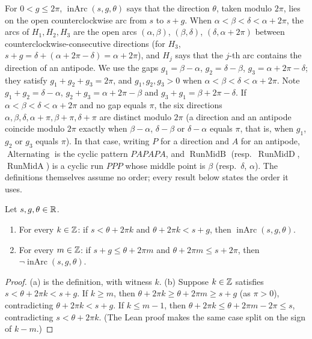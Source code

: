 \begin{remark}\label{pc:rem:reading}
For $0<g\le2\pi$, $\operatorname{inArc}(s,g,\theta)$ says that the direction $\theta$, taken modulo $2\pi$, lies
on the open counterclockwise arc from $s$ to $s+g$. When $\alpha<\beta<\delta<\alpha+2\pi$, the arcs of
$H_1,H_2,H_3$ are the open arcs $(\alpha,\beta)$, $(\beta,\delta)$, $(\delta,\alpha+2\pi)$ between
counterclockwise-consecutive directions (for $H_3$, $s+g=\delta+(\alpha+2\pi-\delta)=\alpha+2\pi$), and $H_j$ says
that the $j$-th arc contains the direction of an antipode. We use the gaps $g_1=\beta-\alpha$,
$g_2=\delta-\beta$, $g_3=\alpha+2\pi-\delta$; they satisfy $g_1+g_2+g_3=2\pi$, and $g_1,g_2,g_3>0$ when
$\alpha<\beta<\delta<\alpha+2\pi$. Note $g_1+g_2=\delta-\alpha$, $g_2+g_3=\alpha+2\pi-\beta$ and
$g_3+g_1=\beta+2\pi-\delta$. If $\alpha<\beta<\delta<\alpha+2\pi$ and no gap equals $\pi$, the six directions
$\alpha,\beta,\delta,\alpha+\pi,\beta+\pi,\delta+\pi$ are distinct modulo $2\pi$ (a direction and an antipode
coincide modulo $2\pi$ exactly when $\beta-\alpha$, $\delta-\beta$ or $\delta-\alpha$ equals $\pi$, that is, when
$g_1$, $g_2$ or $g_3$ equals $\pi$). In that case, writing $P$ for a direction and $A$ for an antipode,
$\operatorname{Alternating}$ is the cyclic pattern $PAPAPA$, and $\operatorname{RunMidB}$ (resp.\
$\operatorname{RunMidD}$, $\operatorname{RunMidA}$) is a cyclic run $PPP$ whose middle point is $\beta$ (resp.\
$\delta$, $\alpha$). The definitions themselves assume no order; every result below states the order it uses.
\end{remark}

\begin{lemma}\label{pc:lem:inarc}
Let $s,g,\theta\in\mathbb R$.
\begin{enumerate}[label=(\alph*)]
\item For every $k\in\mathbb Z$: if $s<\theta+2\pi k$ and $\theta+2\pi k<s+g$, then $\operatorname{inArc}(s,g,\theta)$.
\item For every $m\in\mathbb Z$: if $s+g\le\theta+2\pi m$ and $\theta+2\pi m\le s+2\pi$, then
  $\neg\operatorname{inArc}(s,g,\theta)$.
\end{enumerate}
\end{lemma}

\begin{proof}
(a) is the definition, with witness $k$.
(b) Suppose $k\in\mathbb Z$ satisfies $s<\theta+2\pi k<s+g$. If $k\ge m$, then $\theta+2\pi k\ge\theta+2\pi m\ge s+g$
(as $\pi>0$), contradicting $\theta+2\pi k<s+g$. If $k\le m-1$, then
$\theta+2\pi k\le\theta+2\pi m-2\pi\le s$, contradicting $s<\theta+2\pi k$. (The Lean proof makes the same case
split on the sign of $k-m$.)
\end{proof}

